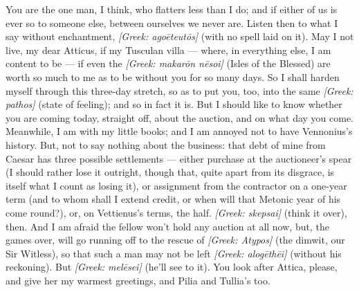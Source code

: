 

 You are the one man, I think, who flatters less than I do; and if either of us is ever so to someone else, between ourselves we never are. Listen then to what I say without enchantment, \textit{[Greek: ago\=eteut\=os]} (with no spell laid on it). May I not live, my dear Atticus, if my Tusculan villa --- where, in everything else, I am content to be --- if even the \textit{[Greek: makar\=on n\=esoi]} (Isles of the Blessed) are worth so much to me as to be without you for so many days. So I shall harden myself through this three-day stretch, so as to put you, too, into the same \textit{[Greek: pathos]} (state of feeling); and so in fact it is. But I should like to know whether you are coming today, straight off, about the auction, and on what day you come. Meanwhile, I am with my little books; and I am annoyed not to have Vennonius's history. But, not to say nothing about the business: that debt of mine from Caesar has three possible settlements --- either purchase at the auctioneer's spear (I should rather lose it outright, though that, quite apart from its disgrace, is itself what I count as losing it), or assignment from the contractor on a one-year term (and to whom shall I extend credit, or when will that Metonic year of his come round?), or, on Vettienus's terms, the half. \textit{[Greek: skepsai]} (think it over), then. And I am afraid the fellow won't hold any auction at all now, but, the games over, will go running off to the rescue of \textit{[Greek: Atypos]} (the dimwit, our Sir Witless), so that such a man may not be left \textit{[Greek: alog\=eth\=ei]} (without his reckoning). But \textit{[Greek: mel\=esei]} (he'll see to it). You look after Attica, please, and give her my warmest greetings, and Pilia and Tullia's too.
